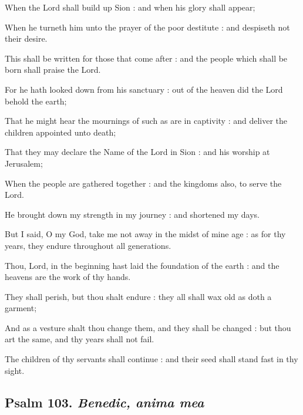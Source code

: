 When the Lord shall build up Sion : and when his glory shall appear;\par
{}When he turneth him unto the prayer of the poor destitute : and despiseth not their desire.\par
{}This shall be written for those that come after : and the people which shall be born shall praise the Lord.\par
{}For he hath looked down from his sanctuary : out of the heaven did the Lord behold the earth;\par
{}That he might hear the mournings of such as are in captivity : and deliver the children appointed unto death;\par
{}That they may declare the Name of the Lord in Sion : and his worship at Jerusalem;\par
{}When the people are gathered together : and the kingdoms also, to serve the Lord.\par
{}He brought down my strength in my journey : and shortened my days.\par
{}But I said, O my God, take me not away in the midst of mine age : as for thy years, they endure throughout all generations.\par
{}Thou, Lord, in the beginning hast laid the foundation of the earth : and the heavens are the work of thy hands.\par
{}They shall perish, but thou shalt endure : they all shall wax old as doth a garment;\par
{}And as a vesture shalt thou change them, and they shall be changed : but thou art the same, and thy years shall not fail.\par
{}The children of thy servants shall continue : and their seed shall stand fast in thy sight.\par

\subsection{Psalm 103. \textit{Benedic, anima mea}}

